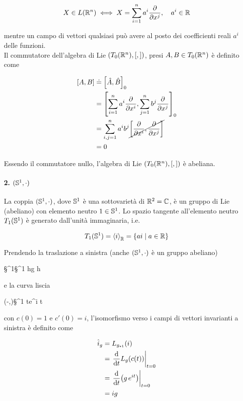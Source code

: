 \begin{equation}
	X \in L(\R^{n}) \iff X = \sum_{i=1}^{n} a^{i} \pdv{x^{j}} \qcomma a^{i} \in \R
\end{equation}

mentre un campo di vettori qualsiasi può avere al posto dei coefficienti reali $ a^{i} $ delle funzioni.\\
Il commutatore dell'algebra di Lie $ (T_{0}(\R^{n}),[,]) $, presi $ A,B \in T_{0}(\R^{n}) $ è definito come

\begin{align}
	\begin{split}
		\comm{A}{B} &\doteq \comm{\hat{A}}{\hat{B}}_{0}\\
		&= \comm{ \sum_{i=1}^{n} a^{i} \pdv{x^{i}} }{ \sum_{j=1}^{n} b^{j} \pdv{x^{j}} }_{0}\\
		&= \sum_{i,j=1}^{n} a^{i} b^{j} \cancel{ \comm{ \pdv{x^{i}} }{ \pdv{x^{j}} } }\\
		&= 0
	\end{split}
\end{align}

Essendo il commutatore nullo, l'algebra di Lie $ (T_{0}(\R^{n}),[,]) $ è abeliana.

\paragraph{2. $ (\S^{1},\cdot) $}

La coppia $ (\S^{1},\cdot) $, dove $ \S^{1} $ è una sottovarietà di $ \R^{2} = \C $, è un gruppo di Lie (abeliano) con elemento neutro $ 1 \in \S^{1} $. Lo spazio tangente all'elemento neutro $ T_{1}(\S^{1}) $ è generato dall'unità immaginaria, i.e.

\begin{equation}
	T_{1}(\S^{1}) = \expval{i}_{\R} = \{ a i \mid a \in \R \}
\end{equation}

Prendendo la traslazione a sinistra (anche $ (\S^{1},\cdot) $ è un gruppo abeliano)

%
	{\S^{1}}{\S^{1}}%
	{h}{g h}
	
e la curva liscia

%
	{(-\varepsilon,\varepsilon)}{\S^{1}}%
	{t}{e^{i t}}
	
con $ c(0) = 1 $ e $ c'(0) = i $, l'isomorfismo verso i campi di vettori invarianti a sinistra è definito come

\begin{align}
	\begin{split}
		\hat{i}_{g} &= L_{g_{*1}} (i)\\
		&= \eval{ \dv{t} L_{g}(c(t)) }_{t=0}\\
		&= \eval{ \dv{t} (g \, e^{i t}) }_{t=0}\\
		&= i g
	\end{split}
\end{align}

